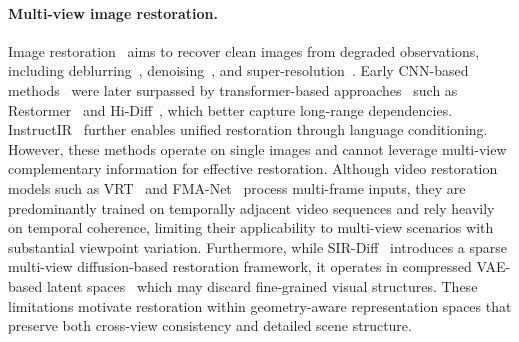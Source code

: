 \paragraph{Multi-view image restoration.}
Image restoration~\cite{Jiang_2025, chen2026lovif2026challengerealworld, zamir2022restormer, Youk_2024_CVPR, zuo2018convolutional, nah2018deepmultiscaleconvolutionalneural} aims to recover clean images from degraded observations, including deblurring~\cite{liang2024vrt, zamir2022restormer, chen2023hierarchical}, denoising~\cite{zamir2022restormer, zhang2018ffdnet, zamfir2024complexityexperts}, and super-resolution~\cite{lin2024diffbir, duan2025dit4sr, min2025text, kim2025unifieddiffusiontransformerhighfidelity}. Early CNN-based methods~\cite{zuo2018convolutional, zhang2018ffdnet} were later surpassed by transformer-based approaches~\cite{zamir2022restormer, chen2023hierarchical} such as Restormer~\cite{zamir2022restormer} and Hi-Diff~\cite{chen2023hierarchical}, which better capture long-range dependencies. InstructIR~\cite{conde2024high} further enables unified restoration through language conditioning. However, these methods operate on single images and cannot leverage multi-view complementary information for effective restoration. Although video restoration models such as VRT~\cite{liang2024vrt} and FMA-Net~\cite{Youk_2024_CVPR} process multi-frame inputs, they are predominantly trained on temporally adjacent video sequences and rely heavily on temporal coherence, limiting their applicability to multi-view scenarios with substantial viewpoint variation. Furthermore, while SIR-Diff~\cite{mao2025sir} introduces a sparse multi-view diffusion-based restoration framework, it operates in compressed VAE-based latent spaces~\cite{kingma2013auto} which may discard fine-grained visual structures. These limitations motivate restoration within geometry-aware representation spaces that preserve both cross-view consistency and detailed scene structure.









